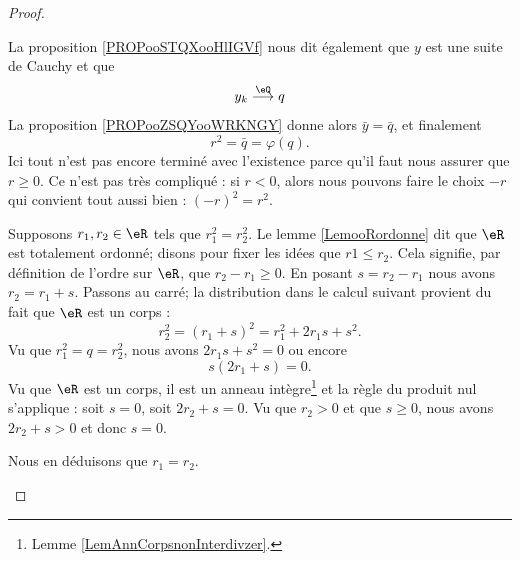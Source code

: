 \begin{proof}
\begin{subproof}
            La proposition \ref{PROPooSTQXooHlIGVf} nous dit également que \( y\) est une suite de Cauchy et que
            \begin{equation}
                y_k\stackrel{\eQ}{\longrightarrow}q
            \end{equation}
            La proposition \ref{PROPooZSQYooWRKNGY} donne alors \( \bar y=\bar q\), et finalement
            \begin{equation}
                r^2=\bar q=\varphi(q).
            \end{equation}
            Ici tout n'est pas encore terminé avec l'existence parce qu'il faut nous assurer que \( r\geq 0\). Ce n'est pas très compliqué : si \( r<0\), alors nous pouvons faire le choix \( -r\) qui convient tout aussi bien : \( (-r)^2=r^2\).
        \item[Unicité]
            Supposons \( r_1,r_2\in \eR\) tels que \( r_1^2=r_2^2\). Le lemme \ref{LemooRordonne} dit que \( \eR\) est totalement ordonné; disons pour fixer les idées que \( r1\leq r_2\). Cela signifie, par définition de l'ordre sur \( \eR\), que \( r_2-r_1\geq 0\). En posant \( s=r_2-r_1\) nous avons \( r_2=r_1+s\). Passons au carré; la distribution dans le calcul suivant provient du fait que \( \eR\) est un corps :
            \begin{equation}
                r_2^2=(r_1+s)^2=r_1^2+2r_1s+s^2.
            \end{equation}
            Vu que \( r_1^2=q=r_2^2\), nous avons \( 2r_1s+s^2=0\) ou encore
            \begin{equation}
                s(2r_1+s)=0.
            \end{equation}
            Vu que \( \eR\) est un corps, il est un anneau intègre\footnote{Lemme \ref{LemAnnCorpsnonInterdivzer}.} et la règle du produit nul s'applique : soit \( s=0\), soit \( 2r_2+s=0\). Vu que \( r_2>0\) et que \( s\geq 0\), nous avons \( 2r_2+s>0\) et donc \( s=0\). 

            Nous en déduisons que \( r_1=r_2\).
    \end{subproof}
\end{proof}
